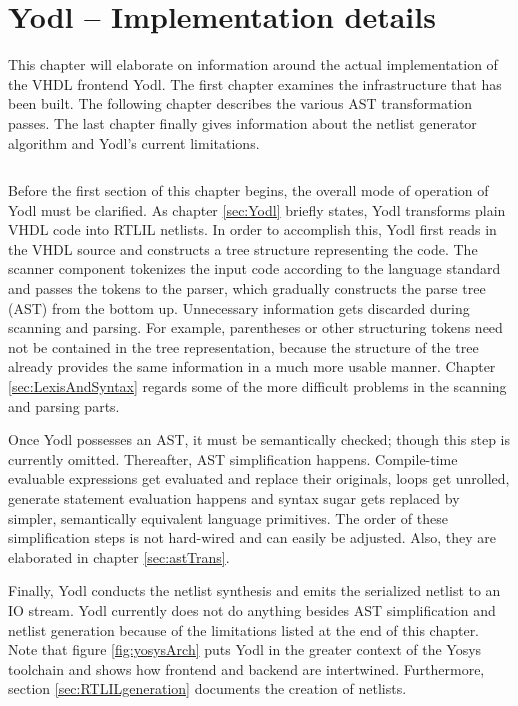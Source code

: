 \chapter{Yodl -- Implementation details}
\label{ch:YodlImplDetails}

This chapter will elaborate on information around the actual
implementation of the VHDL frontend Yodl. The first chapter examines
the infrastructure that has been built. The following chapter
describes the various AST transformation passes. The
last chapter finally gives information about the netlist generator
algorithm and Yodl's current limitations.
%
\begin{lstlisting}

\end{lstlisting}
%
Before the first section of this chapter begins, the overall mode of
operation of Yodl must be clarified. As chapter \ref{sec:Yodl} briefly
states, Yodl transforms plain VHDL code into RTLIL netlists. In order
to accomplish this, Yodl first reads in the VHDL source and constructs
a tree structure representing the code. The scanner component
tokenizes the input code according to the language standard and passes
the tokens to the parser, which gradually constructs the parse tree
(AST) from the bottom up. Unnecessary information gets discarded during
scanning and parsing. For example, parentheses or other structuring
tokens need not be contained in the tree representation, because the
structure of the tree already provides the same information in a much
more usable manner. Chapter \ref{sec:LexisAndSyntax} regards some of
the more difficult problems in the scanning and parsing parts.

Once Yodl possesses an AST, it must be
semantically checked; though this step is currently
omitted. Thereafter, AST simplification happens. Compile-time
evaluable expressions get evaluated and replace their originals, loops
get unrolled, generate statement evaluation happens and syntax sugar
gets replaced by simpler, semantically equivalent language
primitives. The order of these simplification steps is not hard-wired
and can easily be adjusted. Also, they are elaborated in chapter
\ref{sec:astTrans}.

Finally, Yodl conducts the netlist
synthesis and emits the serialized netlist to an IO stream. Yodl
currently does not do anything besides AST simplification and netlist
generation because of the limitations listed at the end of this
chapter. Note that figure \ref{fig:yosysArch} puts Yodl in the greater
context of the Yosys toolchain and shows how frontend and backend are
intertwined. Furthermore, section \ref{sec:RTLILgeneration} documents
the creation of netlists.

